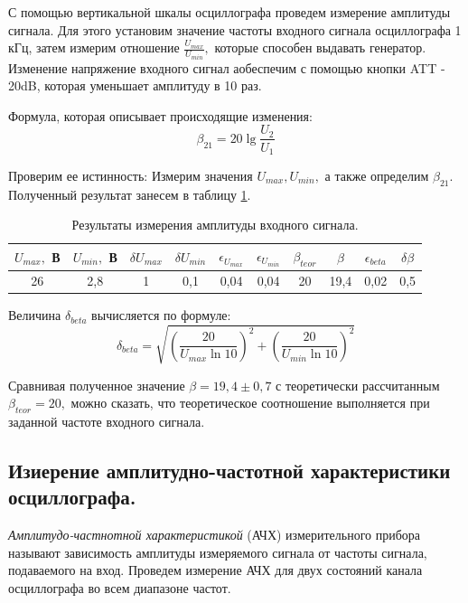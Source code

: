 \documentclass[12pt,a4paper]{article}
\begin{document}
	С помощью вертикальной шкалы осциллографа проведем измерение амплитуды сигнала. Для этого установим значение частоты входного сигнала осциллографа 1 кГц, затем измерим отношение $ \frac{U_{max}}{U_{min}} , $ которые способен выдавать генератор. Изменение напряжение входного сигнал аобеспечим с помощью кнопки ATT - 20dB, которая уменьшает амплитуду в 10 раз.
	
	Формула, которая описывает происходящие изменения:
	$$ \beta_{21} = 20 \lg\frac{U_{2}}{U_{1}} $$
	
	Проверим ее истинность: Измерим значения $ U_{max},U_{min},$ а также определим $ \beta_{21}.$ Полученный результат занесем в таблицу \ref{tab:amplitude}.
	
		
	\begin{table}[h]
		\begin{center}
			\begin{tabular}{|c|c|c|c|c|c|c|c|c|c|}
				\hline
				$U_{max},$ В & $U_{min},$ В & $\delta U_{max}$ & $\delta U_{min}$ & $\epsilon_{U_{max}}$ & $\epsilon_{U_{min}}$ & $\beta_{teor}$ & $\beta$ & $\epsilon_{beta}$ & $\delta \beta$ \\ \hline
				26    & 2,8   & 1  & 0,1 & 0,04 & 0,04 & 20 & 19,4 & 0,02 & 0,5\\ \hline
			\end{tabular}
			\caption{Результаты измерения амплитуды входного сигнала.}
			\label{tab:amplitude}
		\end{center}
	\end{table}
	
	Величина $\delta_{beta}$ вычисляется по формуле: $$ \delta_{beta} = \sqrt{\left(\frac{20}{U_{max}\ln10}\right)^2 + \left(\frac{20}{U_{min}\ln10}\right)^2} $$
	
	Сравнивая полученное значение $ \beta = 19,4 \pm 0,7 $ с теоретически рассчитанным $ \beta_{teor} = 20 , $ можно сказать, что теоретическое соотношение выполняется при заданной частоте входного сигнала.
	
	
	\subsection{Изиерение амплитудно-частотной характеристики осциллографа.}
	
	\textit{Амплитудо-частнотной характеристикой} (АЧХ) измерительного прибора называют зависимость амплитуды измеряемого
сигнала от частоты сигнала, подаваемого на вход.  Проведем измерение АЧХ для двух состояний канала осциллографа во всем диапазоне частот.
\end{document}
